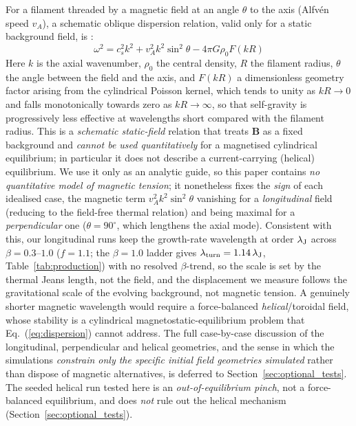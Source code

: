 \documentclass[usenatbib,twoside,twocolumn]{mnras}
\begin{document}
For a filament threaded by a magnetic field at an angle $\theta$ to the axis (Alfv\'en speed $v_A$), a schematic oblique dispersion relation, valid only for a static background field, is \citep{Nakamura1993}:
\begin{equation}
\omega^2 = c_s^2 k^2 + v_A^2 k^2 \sin^2\theta - 4\pi G\rho_0 F(kR)
\label{eq:dispersion}
\end{equation}
Here $k$ is the axial wavenumber, $\rho_0$ the central density, $R$ the filament radius, $\theta$ the angle between the field and the axis, and $F(kR)$ a dimensionless geometry factor arising from the cylindrical Poisson kernel, which tends to unity as $kR\to0$ and falls monotonically towards zero as $kR\to\infty$, so that self-gravity is progressively less effective at wavelengths short compared with the filament radius. This is a \emph{schematic static-field} relation that treats $\mathbf{B}$ as a fixed background and \emph{cannot be used quantitatively} for a magnetised cylindrical equilibrium; in particular it does not describe a current-carrying (helical) equilibrium. We use it only as an analytic guide, so this paper contains \emph{no quantitative model of magnetic tension}; it nonetheless fixes the \emph{sign} of each idealised case, the magnetic term $v_A^2k^2\sin^2\theta$ vanishing for a \emph{longitudinal} field (reducing to the field-free thermal relation) and being maximal for a \emph{perpendicular} one ($\theta=90^\circ$, which lengthens the axial mode). Consistent with this, our longitudinal runs keep the growth-rate wavelength at order $\lambda_{\rm J}$ across $\beta=0.3$--$1.0$ ($f=1.1$; the $\beta=1.0$ ladder gives $\lambda_{\rm turn}=1.14\,\lambda_{\rm J}$, Table~\ref{tab:production}) with no resolved $\beta$-trend, so the scale is set by the thermal Jeans length, not the field, and the displacement we measure follows the gravitational scale of the evolving background, not magnetic tension. A genuinely shorter magnetic wavelength would require a force-balanced \emph{helical}/toroidal field, whose stability is a cylindrical magnetostatic-equilibrium problem that Eq.~(\ref{eq:dispersion}) cannot address. The full case-by-case discussion of the longitudinal, perpendicular and helical geometries, and the sense in which the simulations \emph{constrain only the specific initial field geometries simulated} rather than dispose of magnetic alternatives, is deferred to Section~\ref{sec:optional_tests}. The seeded helical run tested here is an \emph{out-of-equilibrium pinch}, not a force-balanced equilibrium, and does \emph{not} rule out the helical mechanism (Section~\ref{sec:optional_tests}).
\end{document}
